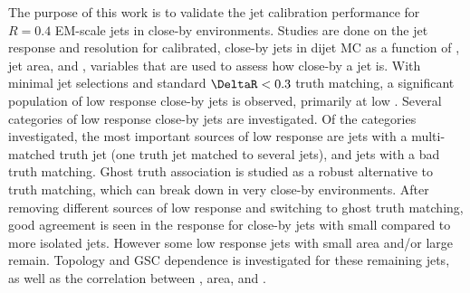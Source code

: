 The purpose of this work is to validate the jet calibration performance for $R = 0.4$ \akt EM-scale jets in close-by environments. Studies are done on the jet response and resolution for calibrated, close-by jets in  dijet MC as a function of \DeltaRmin, jet area, and \fCloseby, variables that are used to assess how close-by a jet is. With minimal jet selections and standard $\DeltaR < 0.3$ truth matching, a significant population of low response close-by jets is observed, primarily at low \pt. Several categories of low response close-by jets are investigated. Of the categories investigated, the most important sources of low response are jets with a multi-matched truth jet (one truth jet matched to several jets), and jets with a bad truth matching. Ghost truth association is studied as a robust alternative to \DeltaR truth matching, which can break down in very close-by environments. After removing different sources of low response and switching to ghost truth matching, good agreement is seen in the response for close-by jets with small \DeltaRmin compared to more isolated jets. However some low response jets with small area and/or large \fCloseby remain. Topology and GSC dependence is investigated for these remaining jets, as well as the correlation between \DeltaRmin, area, and \fCloseby.